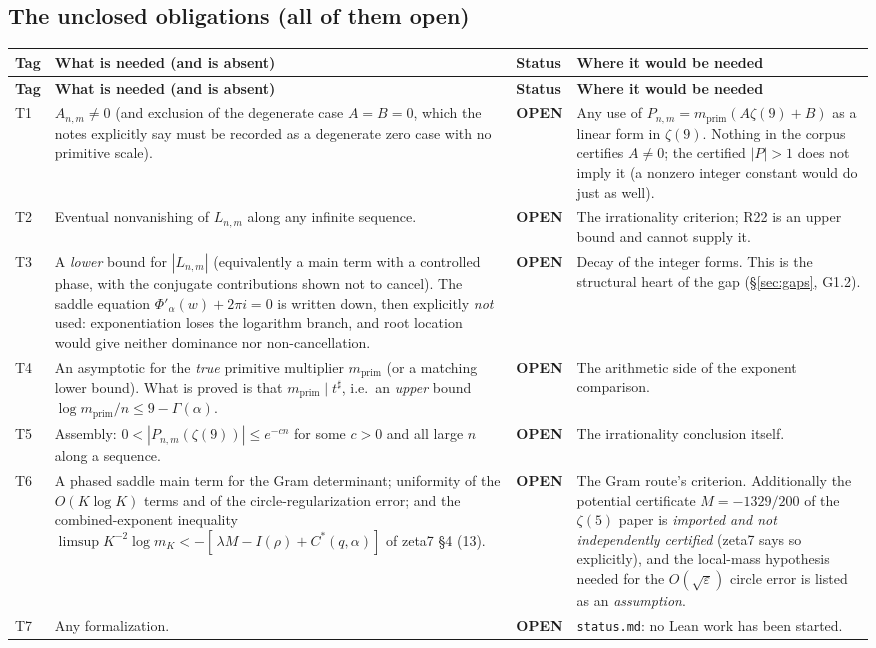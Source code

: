 \documentclass[11pt]{article}
\newcommand{\stO}{\textcolor{gapred}{\textbf{OPEN}}}
\begin{document}
\subsection{The unclosed obligations (all of them open)}

\begin{longtable}{@{}p{}p{}p{}p{}@{}}
\toprule \textbf{Tag} & \textbf{What is needed (and is absent)} & \textbf{Status} & \textbf{Where it would be needed} \\ \midrule
\endfirsthead
\toprule \textbf{Tag} & \textbf{What is needed (and is absent)} & \textbf{Status} & \textbf{Where it would be needed} \\ \midrule
\endhead
T1 & $A_{n,m}\ne0$ (and exclusion of the degenerate case $A=B=0$, which the notes explicitly say must
     be recorded as a degenerate zero case with no primitive scale). & \stO
     & Any use of $P_{n,m}=m_{\mathrm{prim}}(A\zeta(9)+B)$ as a linear form in $\zeta(9)$. Nothing in
     the corpus certifies $A\ne0$; the certified $|P|>1$ does not imply it (a nonzero integer constant
     would do just as well). \\
T2 & Eventual nonvanishing of $L_{n,m}$ along any infinite sequence. & \stO
     & The irrationality criterion; R22 is an upper bound and cannot supply it. \\
T3 & A \emph{lower} bound for $|L_{n,m}|$ (equivalently a main term with a controlled phase, with the
     conjugate contributions shown not to cancel). The saddle equation
     $\Phi'_\alpha(w)+2\pi i=0$ is written down, then explicitly \emph{not} used: exponentiation loses
     the logarithm branch, and root location would give neither dominance nor non-cancellation. & \stO
     & Decay of the integer forms. This is the structural heart of the gap (\S\ref{sec:gaps}, G1.2). \\
T4 & An asymptotic for the \emph{true} primitive multiplier $m_{\mathrm{prim}}$ (or a matching lower
     bound). What is proved is that $m_{\mathrm{prim}}\mid t^{\sharp}$, i.e.\ an \emph{upper} bound
     $\log m_{\mathrm{prim}}/n\le9-\Gamma(\alpha)$. & \stO
     & The arithmetic side of the exponent comparison. \\
T5 & Assembly: $0<|P_{n,m}(\zeta(9))|\le e^{-cn}$ for some $c>0$ and all large $n$ along a sequence. & \stO
     & The irrationality conclusion itself. \\
T6 & A phased saddle main term for the Gram determinant; uniformity of the $O(K\log K)$ terms and of
     the circle-regularization error; and the combined-exponent inequality
     $\limsup K^{-2}\log m_K<-[\,\lambda M-I(\rho)+C^{*}(q,\alpha)]$ of zeta7 \S4 (13). & \stO
     & The Gram route's criterion. Additionally the potential certificate $M=-1329/200$ of the
     $\zeta(5)$ paper is \emph{imported and not independently certified} (zeta7 says so explicitly), and
     the local-mass hypothesis needed for the $O(\sqrt\varepsilon)$ circle error is listed as an
     \emph{assumption}. \\
T7 & Any formalization. & \stO & \texttt{status.md}: no Lean work has been started. \\
\bottomrule
\end{longtable}
\end{document}
